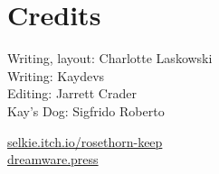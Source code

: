
\section{Credits}
\thispagestyle{empty}

Writing, layout: Charlotte Laskowski\\
Writing: Kaydevs\\
Editing: Jarrett Crader\\
Kay's Dog: Sigfrido Roberto

\skipline\skipline

\begin{adjustbox}{center}
\end{adjustbox}

\skipline

\href{https://selkie.itch.io/rosethorn-keep}{selkie.itch.io/rosethorn-keep}\\
\href{https://dreamware.press}{dreamware.press}